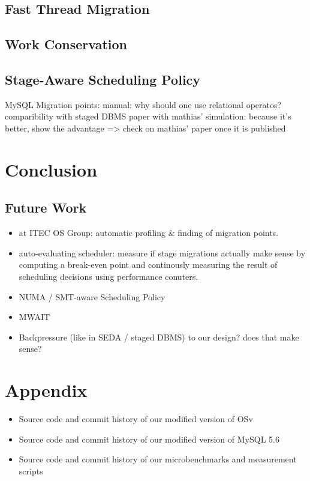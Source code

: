\documentclass[12pt,a4paper]{book}
\begin{document}
\section{Fast Thread Migration}
\section{Work Conservation}
\section{Stage-Aware Scheduling Policy}
MySQL Migration points:
    manual: why should one use relational operatos? comparibility with staged DBMS paper
    with mathias' simulation: because it's better, show the advantage => check on mathias' paper once it is published
\chapter{Conclusion}\label{ch:concl}
\blindtext
\section{Future Work}
\begin{itemize}
    \item at ITEC OS Group: automatic profiling \& finding of migration points.
    \item auto-evaluating scheduler: measure if stage migrations actually make sense by computing a break-even point and continously measuring the result of scheduling decisions using performance conuters.
    \item NUMA / SMT-aware Scheduling Policy
    \item MWAIT
    \item Backpressure (like in SEDA / staged DBMS) to our design? does that make sense?
\end{itemize}

\backmatter

\chapter{Appendix}
\blindtext
\begin{itemize}
    \item Source code and commit history of our modified version of OSv
    \item Source code and commit history of our modified version of MySQL 5.6
    \item Source code and commit history of our microbenchmarks and measurement scripts
\end{itemize}

\cleardoublepage
{}
{}
\printbibliography
\end{document}
